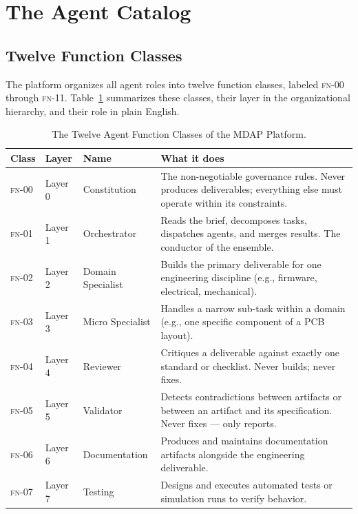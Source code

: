 \documentclass[12pt]{article}
\newcommand{\FN}[1]{\textsc{fn-#1}}
\begin{document}
\section{The Agent Catalog}
\label{sec:catalog}

\subsection{Twelve Function Classes}

The platform organizes all agent roles into twelve function classes,
labeled \FN{00} through \FN{11}.
Table~\ref{tab:functions} summarizes these classes, their layer in the
organizational hierarchy, and their role in plain English.

\begin{table}[H]
\centering
\caption{The Twelve Agent Function Classes of the MDAP Platform.}
\label{tab:functions}
\begin{tabular}{@{}lllp{7cm}@{}}
\toprule
\textbf{Class} & \textbf{Layer} & \textbf{Name} & \textbf{What it does} \\
\midrule
\FN{00} & Layer 0 & Constitution &
  The non-negotiable governance rules.
  Never produces deliverables; everything else must operate within
  its constraints. \\
\FN{01} & Layer 1 & Orchestrator &
  Reads the brief, decomposes tasks, dispatches agents, and
  merges results. The conductor of the ensemble. \\
\FN{02} & Layer 2 & Domain Specialist &
  Builds the primary deliverable for one engineering discipline
  (e.g., firmware, electrical, mechanical). \\
\FN{03} & Layer 3 & Micro Specialist &
  Handles a narrow sub-task within a domain (e.g., one specific
  component of a PCB layout). \\
\FN{04} & Layer 4 & Reviewer &
  Critiques a deliverable against exactly one standard or checklist.
  Never builds; never fixes. \\
\FN{05} & Layer 5 & Validator &
  Detects contradictions between artifacts or between an artifact
  and its specification.  Never fixes --- only reports. \\
\FN{06} & Layer 6 & Documentation &
  Produces and maintains documentation artifacts alongside the
  engineering deliverable. \\
\FN{07} & Layer 7 & Testing &
  Designs and executes automated tests or simulation runs to
  verify behavior. \\

\end{tabular}
\end{table}
\end{document}
